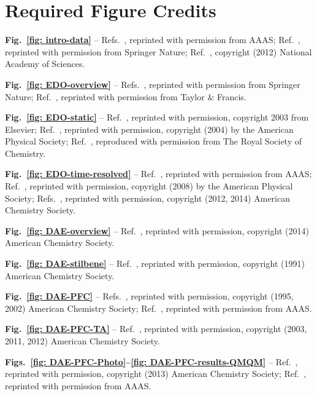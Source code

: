 \chapter{Required Figure Credits}
\label{ap: permissions}

\noindent
\textbf{Fig.~\ref{fig: intro-data}} --
Refs.~\cite{Ihee2001, Siwick2003, Baum2007, Ernstorfer2009},
reprinted with permission from AAAS;
Ref.~\cite{Eichberger2010}, reprinted with permission from Springer Nature;
Ref.~\cite{Zamponi2012}, copyright (2012) National Academy of Sciences.

\bigskip \noindent
\textbf{Fig.~\ref{fig: EDO-overview}} --
Refs.~\cite{BechgaardJerome1982, Dressel2007},
reprinted with permission from Springer Nature;
Ref.~\cite{Jerome1982}, reprinted with permission from Taylor \& Francis.

\bigskip \noindent
\textbf{Fig.~\ref{fig: EDO-static}} --
Ref.~\cite{Drozdova2003}, reprinted with permission, copyright \textsuperscript{\textcopyright{}} 2003
from Elsevier;
Ref.~\cite{Drozdova2004}, reprinted with permission, copyright (2004)
by the American Physical Society;
Ref.~\cite{Aoyagi2004}, reproduced with permission from The Royal Society of Chemistry.

\bigskip \noindent
\textbf{Fig.~\ref{fig: EDO-time-resolved}} --
Ref.~\cite{Chollet2004}, reprinted with permission from AAAS;
Ref.~\cite{Onda2008}, reprinted with permission, copyright (2008)
by the American Physical Society;
Refs.~\cite{Fukazawa2012, Onda2014}, reprinted with permission,
copyright (2012, 2014) American Chemistry Society.

\bigskip \noindent
\textbf{Fig.~\ref{fig: DAE-overview}} --
Ref.~\cite{Irie2014}, reprinted with permission, copyright (2014) American Chemistry Society.

\bigskip \noindent
\textbf{Fig.~\ref{fig: DAE-stilbene}} --
Ref.~\cite{Repinec1991}, reprinted with permission, copyright (1991) American Chemistry Society.

\bigskip \noindent
\textbf{Fig.~\ref{fig: DAE-PFC}} --
Refs.~\cite{Irie1995, Shibata2002}, reprinted with permission, copyright (1995, 2002) American Chemistry Society;
Ref.~\cite{Irie2001}, reprinted with permission from AAAS.

\bigskip \noindent
\textbf{Fig.~\ref{fig: DAE-PFC-TA}} --
Ref.~\cite{Jean-Ruel2011, Ward2012, Boggio2003}, reprinted with permission, copyright (2003, 2011, 2012) American Chemistry Society.

\bigskip \noindent
\textbf{Figs.~\ref{fig: DAE-PFC-Photo}--\ref{fig: DAE-PFC-results-QMQM}} --
Ref.~\cite{Jean-Ruel2013}, reprinted with permission, copyright (2013) American Chemistry Society; Ref.~\cite{Irie2001}, reprinted with permission from AAAS.

